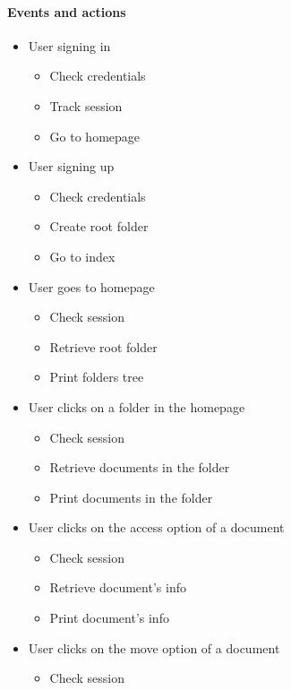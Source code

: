 \documentclass[a4paper,12pt]{article}
\begin{document}
\begin{multicols}{2}
\begin{itemize}
\end{itemize}
\end{multicols}
\newpage
\paragraph{Events and actions}
\begin{multicols}{2}
\begin{itemize}
	\item{User signing in}
	\begin{itemize}
		\item{Check credentials}
		\item{Track session}
		\item{Go to homepage}
	\end{itemize}
	\item{User signing up}
	\begin{itemize}
		\item{Check credentials}
		\item{Create root folder}
		\item{Go to index}
	\end{itemize}
	\item{User goes to homepage}
	\begin{itemize}
		\item{Check session}
		\item{}Retrieve root folder
		\item{Print folders tree}
	\end{itemize}
	\item{User clicks on a folder in the homepage}
	\begin{itemize}
		\item{Check session}
		\item{Retrieve documents in the folder}
		\item{Print documents in the folder}
	\end{itemize}
	\item{User clicks on the access option of a document}
	\begin{itemize}
		\item{Check session}
		\item{Retrieve document's info}
		\item{Print document's info}
	\end{itemize}
	\item{User clicks on the move option of a document}
	\begin{itemize}
		\item{Check session}

\end{itemize}
\end{itemize}
\end{multicols}
\end{document}
